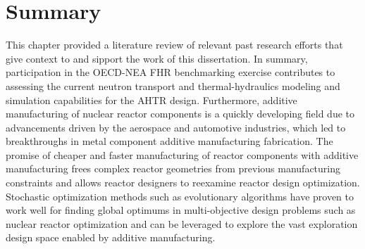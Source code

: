 \section{Summary}
This chapter provided a literature review of relevant past research efforts that 
give context to and sipport the work of this dissertation. 
In summary, participation in the \acrfull{OECD}-\acrfull{NEA} \acrfull{FHR} 
benchmarking exercise contributes to assessing the current neutron transport and 
thermal-hydraulics modeling and simulation capabilities for the \acrfull{AHTR} design.
Furthermore, additive manufacturing of nuclear reactor components is a quickly 
developing field due to advancements driven by the aerospace and automotive industries, 
which led to breakthroughs in metal component additive manufacturing fabrication. 
The promise of cheaper and faster manufacturing of reactor components with 
additive manufacturing frees complex reactor geometries from previous 
manufacturing constraints and allows reactor designers to reexamine reactor 
design optimization.  
Stochastic optimization methods such as evolutionary algorithms have proven to 
work well for finding global optimums in multi-objective design problems such as 
nuclear reactor optimization and can be leveraged to explore the vast exploration 
design space enabled by additive manufacturing.
